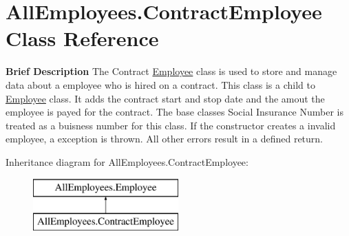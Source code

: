 \hypertarget{class_all_employees_1_1_contract_employee}{}\section{All\+Employees.\+Contract\+Employee Class Reference}
\label{class_all_employees_1_1_contract_employee}


{\bfseries Brief Description} The Contract \hyperlink{class_all_employees_1_1_employee}{Employee} class is used to store and manage data about a employee who is hired on a contract. This class is a child to \hyperlink{class_all_employees_1_1_employee}{Employee} class. It adds the contract start and stop date and the amout the employee is payed for the contract. The base classes Social Insurance Number is treated as a buisness number for this class. If the constructor creates a invalid employee, a exception is thrown. All other errors result in a defined return.  


Inheritance diagram for All\+Employees.\+Contract\+Employee\+:\begin{figure}[H]
\begin{center}
\leavevmode
\includegraphics[height=2.000000cm]{class_all_employees_1_1_contract_employee}
\end{center}
\end{figure}
